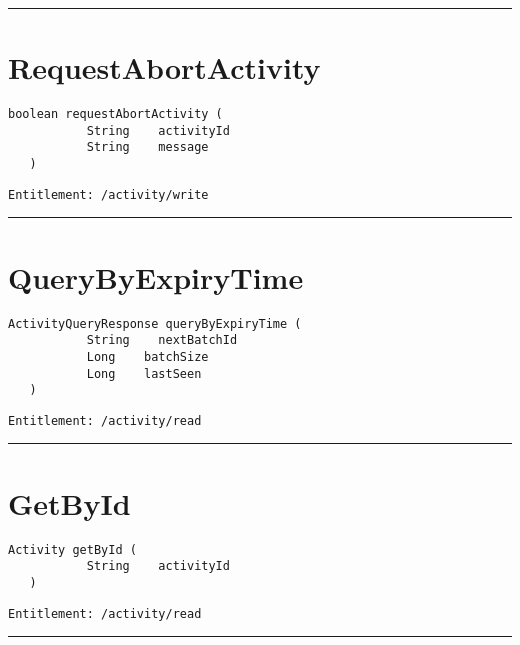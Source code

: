 \rule{12cm}{2pt}
\section{RequestAbortActivity}
\label{Api:RequestAbortActivity}
\begin{lstlisting}[style=nonumbers]
   boolean requestAbortActivity (
           String    activityId
           String    message
   )
\end{lstlisting}
\begin{Verbatim}[formatcom=\color{Maroon}]
  Entitlement: /activity/write
\end{Verbatim}



\rule{12cm}{2pt}
\section{QueryByExpiryTime}
\label{Api:QueryByExpiryTime}
\begin{lstlisting}[style=nonumbers]
   ActivityQueryResponse queryByExpiryTime (
           String    nextBatchId
           Long    batchSize
           Long    lastSeen
   )
\end{lstlisting}
\begin{Verbatim}[formatcom=\color{Maroon}]
  Entitlement: /activity/read
\end{Verbatim}



\rule{12cm}{2pt}
\section{GetById}
\label{Api:GetById}
\begin{lstlisting}[style=nonumbers]
   Activity getById (
           String    activityId
   )
\end{lstlisting}
\begin{Verbatim}[formatcom=\color{Maroon}]
  Entitlement: /activity/read
\end{Verbatim}



\rule{12cm}{2pt}

